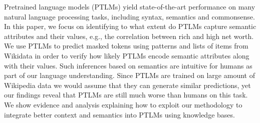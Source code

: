 Pretrained language models (PTLMs) yield state-of-the-art performance on many natural language processing tasks, including syntax, semantics and commonsense. In this paper, we focus on identifying to what extent do PTLMs capture semantic attributes and their values, e.g., the correlation between rich and high net worth. We use PTLMs to predict masked tokens using patterns and lists of items from Wikidata in order to verify how likely PTLMs encode semantic attributes along with their values. Such inferences based on semantics are intuitive for humans as part of our language understanding. Since PTLMs are trained on large amount of Wikipedia data we would assume that they can generate similar predictions, yet our findings reveal that PTLMs are still much worse than humans on this task. We show evidence and analysis explaining how to exploit our methodology to integrate better context and semantics into PTLMs using knowledge bases.
